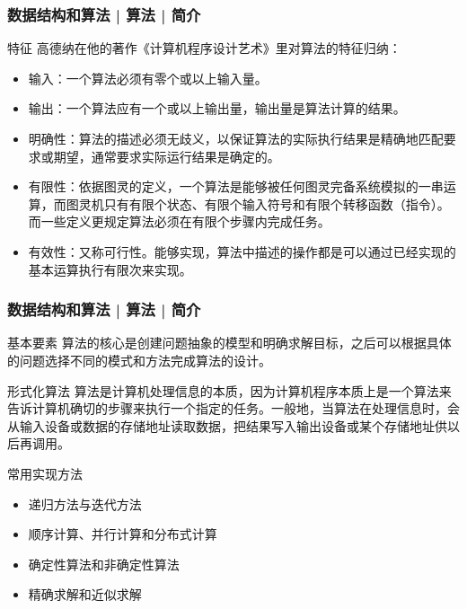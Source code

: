 \begin{frame}
  \frametitle{数据结构和算法 | 算法 | 简介}
  \begin{block}{特征}
高德纳在他的著作《计算机程序设计艺术》里对算法的特征归纳：
\begin{itemize}
  \item 输入：一个算法必须有零个或以上输入量。
  \item 输出：一个算法应有一个或以上输出量，输出量是算法计算的结果。
  \item 明确性：算法的描述必须无歧义，以保证算法的实际执行结果是精确地匹配要求或期望，通常要求实际运行结果是确定的。
  \item 有限性：依据图灵的定义，一个算法是能够被任何图灵完备系统模拟的一串运算，而图灵机只有有限个状态、有限个输入符号和有限个转移函数（指令）。而一些定义更规定算法必须在有限个步骤内完成任务。
  \item 有效性：又称可行性。能够实现，算法中描述的操作都是可以通过已经实现的基本运算执行有限次来实现。
\end{itemize}
  \end{block}
\end{frame}

\begin{frame}
  \frametitle{数据结构和算法 | 算法 | 简介}
  \begin{block}{基本要素}
算法的核心是\alert{创建问题抽象的模型和明确求解目标}，之后可以根据具体的问题选择不同的模式和方法完成算法的设计。
  \end{block}
  \pause
  \begin{block}{形式化算法}
算法是计算机处理信息的本质，因为\alert{计算机程序本质上是一个算法来告诉计算机确切的步骤来执行一个指定的任务}。一般地，当算法在处理信息时，会从输入设备或数据的存储地址读取数据，把结果写入输出设备或某个存储地址供以后再调用。
  \end{block}
  \pause
  \begin{block}{常用实现方法}
    \begin{itemize}
      \item 递归方法与迭代方法
      \item 顺序计算、并行计算和分布式计算
      \item 确定性算法和非确定性算法
      \item 精确求解和近似求解 
    \end{itemize}
  \end{block}
\end{frame}

